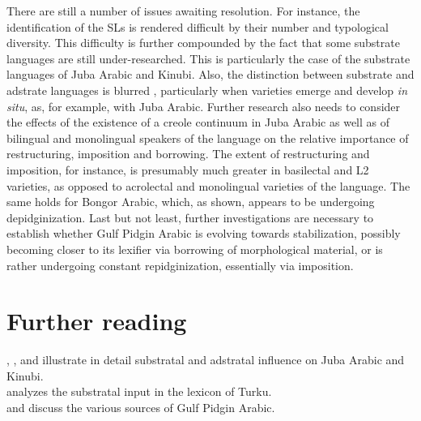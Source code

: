 \documentclass[output=paper]{langsci/langscibook}
\begin{document}
  There are still a number of issues awaiting resolution. For instance, the identification of the SLs is rendered difficult by their number and typological diversity. This difficulty is further compounded by the fact that some substrate languages are still under-researched. This is particularly the case of the substrate languages of Juba Arabic and Kinubi. Also, the distinction between substrate and adstrate languages is blurred \citep[132]{Nakao2012}, particularly when varieties emerge and develop \textit{in} \textit{situ}, as, for example, with Juba Arabic. Further research also needs to consider the effects of the existence of a creole continuum in Juba Arabic as well as of bilingual and monolingual speakers of the language on the relative importance of restructuring, imposition and borrowing. The extent of restructuring and imposition, for instance, is presumably much greater in basilectal and L2 varieties, as opposed to acrolectal and monolingual varieties of the language. The same holds for Bongor Arabic, which, as shown, appears to be undergoing depidginization. Last but not least, further investigations are necessary to establish whether Gulf Pidgin Arabic is evolving towards stabilization, possibly becoming closer to its lexifier via borrowing of morphological material, or is rather undergoing constant repidginization, essentially via imposition.  

\section*{Further reading}

\citet{Miller1993}, \citet{Nakao2012}, and \citet{Luffin2014} illustrate in detail substratal and adstratal influence on Juba Arabic and Kinubi.\\
\citet{Avram2019} analyzes the substratal input in the lexicon of Turku.\\
\citet{Avram2017article} and \citet{Bakir2017} discuss the various sources of Gulf Pidgin Arabic.
\end{document}
